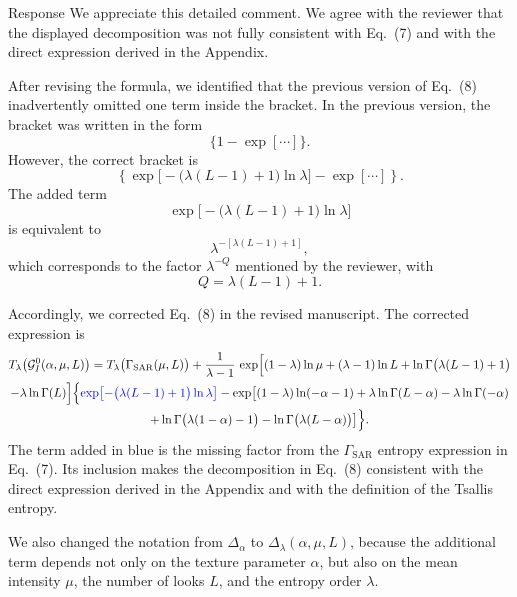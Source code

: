 \documentclass[11pt]{report}
\begin{document}
\begin{responsebox}{Response}
We appreciate this detailed comment.  We agree with the reviewer that the displayed decomposition was not fully consistent with Eq.~(7) and with the direct expression derived in the Appendix.

After revising the formula, we identified that the previous version of Eq.~(8) inadvertently omitted one term inside the bracket. In the previous version, the bracket was written in the form
\begin{equation*}
\{1-\exp[\cdots]\}.
\end{equation*}
However, the correct bracket is
\begin{equation*}
\left\{
\exp\bigl[-\bigl(\lambda(L-1)+1\bigr)\ln\lambda\bigr]
-
\exp[\cdots]
\right\}.
\end{equation*}
The added term
\begin{equation*}
\exp\bigl[-\bigl(\lambda(L-1)+1\bigr)\ln\lambda\bigr]
\end{equation*}
is equivalent to
\begin{equation*}
\lambda^{-[\lambda(L-1)+1]},
\end{equation*}
which corresponds to the factor $\lambda^{-Q}$ mentioned by the reviewer, with
\begin{equation*}
Q=\lambda(L-1)+1.
\end{equation*}

Accordingly, we corrected Eq.~(8) in the revised manuscript. The corrected expression is
\begin{multline*}
T_\lambda\bigl(\mathcal{G}^0_I(\alpha, \mu, L)\bigr)
=
T_\lambda\bigl(\Gamma_{\mathrm{SAR}}(\mu, L)\bigr)
+
\frac{1}{\lambda-1}\,
\exp\Bigl[
(1-\lambda)\ln\mu
+(\lambda-1)\ln L
+\ln\Gamma\bigl(\lambda(L-1)+1\bigr)\\
-\lambda\ln\Gamma(L)
\Bigr]
\Bigl\{
\textcolor{blue}{\exp\bigl[-\bigl(\lambda(L-1)+1\bigr)\ln\lambda\bigr]}
-
\exp\bigl[
(1-\lambda)\ln(-\alpha-1)
+\lambda\ln\Gamma(L-\alpha)
-\lambda\ln\Gamma(-\alpha)\\
+\ln\Gamma\bigl(\lambda(1-\alpha)-1\bigr)
-\ln\Gamma\bigl(\lambda(L-\alpha)\bigr)
\bigr]
\Bigr\}.
\end{multline*}
The term added in blue is the missing factor from the $\Gamma_{\mathrm{SAR}}$ entropy expression in Eq.~(7). 
Its inclusion makes the decomposition in Eq.~(8) consistent with the direct expression derived in the Appendix and with the definition of the Tsallis entropy.

We also changed the notation from $\Delta_\alpha$ to $\Delta_\lambda(\alpha,\mu,L)$, because the additional term depends not only on the texture parameter $\alpha$, but also on the mean intensity $\mu$, the number of looks $L$, and the entropy order $\lambda$.


\end{responsebox}
\end{document}
